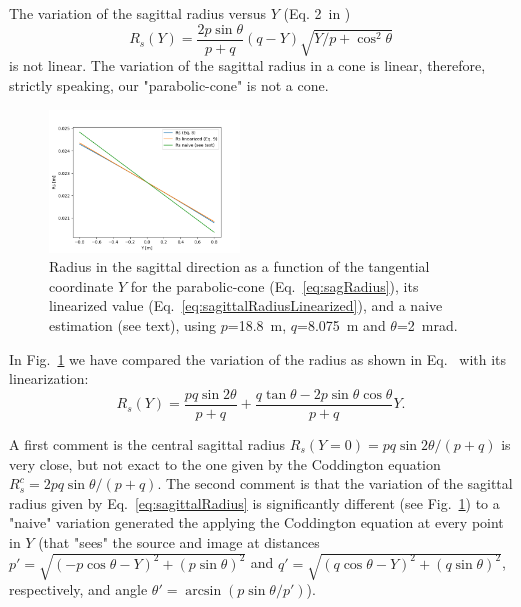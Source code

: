 \documentclass[a4paper, 11pt]{article}
\begin{document}
The variation of the sagittal radius versus $Y$  (Eq. 2\ in \cite{Valeriy2020c})
\begin{equation}
\label{eq:sagRadius}
R_s(Y) = \frac{2  p \sin\theta}{p + q} (q - Y)   \sqrt{Y / p + \cos^2\theta}
\end{equation}
is not linear. The variation of the sagittal radius in a cone is linear, therefore, strictly speaking, our "parabolic-cone" is not a cone. 

\begin{figure}[h]
\centering
\includegraphics[width=0.45\textwidth]{figures/sagittalradius.png}
\caption{\label{fig:sagittalRadius}Radius in the sagittal direction as a function of the tangential coordinate $Y$ for the parabolic-cone (Eq.~\ref{eq:sagRadius}), its linearized value (Eq.~\ref{eq:sagittalRadiusLinearized}), and a naive estimation (see text), using $p$=18.8~m, $q$=8.075~m and $\theta$=2~mrad.
}
\end{figure}

In Fig.~\ref{fig:sagittalRadius} we have compared the variation of the radius as shown in Eq.~\label{eq:sagittalRadius} with its linearization:
\begin{equation}
\label{eq:sagittalRadiusLinearized}
R_s(Y) = \frac{p q \sin2\theta  }{p + q} + \frac{q \tan\theta - 2 p \sin\theta \cos\theta}{p + q} Y.
\end{equation}


A first comment is the central sagittal radius $R_s(Y=0)=p q \sin2\theta / (p+q)$ is very close, but not exact to the one given by the Coddington equation $R_s^c=2 p q \sin\theta / (p+q)$. The second comment is that the variation of the sagittal radius given by Eq.~\ref{eq:sagittalRadius} is significantly different (see Fig.~\ref{fig:sagittalRadius}) to a "naive" variation generated the applying the Coddington equation at every point in $Y$ (that "sees" the source and image at distances $p'=\sqrt{(-p \cos\theta - Y)^2 + (p \sin\theta)^2}$ and $q'=\sqrt{(q \cos\theta - Y)^2 + (q \sin\theta)^2}$, respectively, and angle $\theta'=\arcsin(p \sin\theta / p')$).
\end{document}
